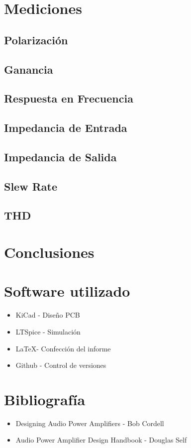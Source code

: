 \documentclass[a4paper,12pt,twoside]{article}
\begin{document}
\newpage
\section{Mediciones}
\subsection{Polarización}
\subsection{Ganancia}
\subsection{Respuesta en Frecuencia}
\subsection{Impedancia de Entrada}
\subsection{Impedancia de Salida}
\subsection{Slew Rate}
\subsection{THD}

\newpage

\section{Conclusiones}

\section{Software utilizado}
\begin{itemize}
\item KiCad - Diseño PCB
\item LTSpice - Simulación
\item \LaTeX - Confección del informe
\item Github - Control de versiones
\end{itemize}
\section{Bibliografía}

\begin{itemize}
\item Designing Audio Power Amplifiers - Bob Cordell
\item Audio Power Amplifier Design Handbook - Douglas Self 

\end{itemize}
\end{document}
